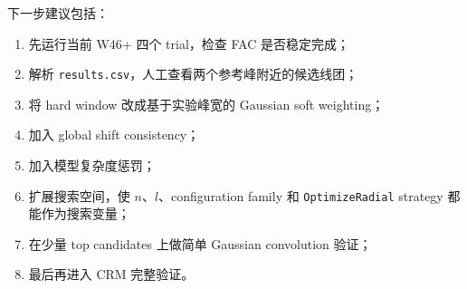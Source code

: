 \documentclass[11pt,a4paper]{article}
\begin{document}
下一步建议包括：

\begin{enumerate}
  \item 先运行当前 W46+ 四个 trial，检查 FAC 是否稳定完成；
  \item 解析 \texttt{results.csv}，人工查看两个参考峰附近的候选线团；
  \item 将 hard window 改成基于实验峰宽的 Gaussian soft weighting；
  \item 加入 global shift consistency；
  \item 加入模型复杂度惩罚；
  \item 扩展搜索空间，使 $n$、$l$、configuration family 和
    \texttt{OptimizeRadial} strategy 都能作为搜索变量；
  \item 在少量 top candidates 上做简单 Gaussian convolution 验证；
  \item 最后再进入 CRM 完整验证。
\end{enumerate}
\end{document}

